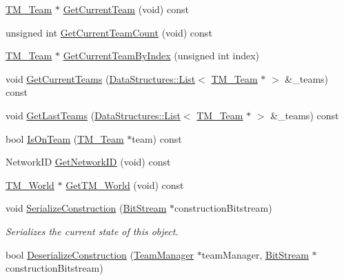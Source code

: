 \begin{DoxyCompactItemize}
\hyperlink{class_rak_net_1_1_t_m___team}{T\-M\-\_\-\-Team} $\ast$ \hyperlink{class_rak_net_1_1_t_m___team_member_a9a0d940b22353dc806fa71bcbac025ee}{Get\-Current\-Team} (void) const 
\item 
unsigned int \hyperlink{class_rak_net_1_1_t_m___team_member_a994cd7414421f0e01a5cc9c8b5d8c899}{Get\-Current\-Team\-Count} (void) const 
\item 
\hyperlink{class_rak_net_1_1_t_m___team}{T\-M\-\_\-\-Team} $\ast$ \hyperlink{class_rak_net_1_1_t_m___team_member_a8c9c72607051fb0c5769cb0d4d9b9744}{Get\-Current\-Team\-By\-Index} (unsigned int index)
\item 
void \hyperlink{class_rak_net_1_1_t_m___team_member_a722e179863d8f3810d6ec1326c8f0782}{Get\-Current\-Teams} (\hyperlink{class_data_structures_1_1_list}{Data\-Structures\-::\-List}$<$ \hyperlink{class_rak_net_1_1_t_m___team}{T\-M\-\_\-\-Team} $\ast$ $>$ \&\-\_\-teams) const 
\item 
void \hyperlink{class_rak_net_1_1_t_m___team_member_ad1c944003544544dc286080adb1bff1b}{Get\-Last\-Teams} (\hyperlink{class_data_structures_1_1_list}{Data\-Structures\-::\-List}$<$ \hyperlink{class_rak_net_1_1_t_m___team}{T\-M\-\_\-\-Team} $\ast$ $>$ \&\-\_\-teams) const 
\item 
bool \hyperlink{class_rak_net_1_1_t_m___team_member_a4473bcb51cb8ef03d80a667947db44fa}{Is\-On\-Team} (\hyperlink{class_rak_net_1_1_t_m___team}{T\-M\-\_\-\-Team} $\ast$team) const 
\item 
Network\-I\-D \hyperlink{class_rak_net_1_1_t_m___team_member_a5f8a84aba15b81123840d5b572322f09}{Get\-Network\-I\-D} (void) const 
\item 
\hyperlink{class_rak_net_1_1_t_m___world}{T\-M\-\_\-\-World} $\ast$ \hyperlink{class_rak_net_1_1_t_m___team_member_abd0b7f8951bc80a89dfc3d0f9c80c48a}{Get\-T\-M\-\_\-\-World} (void) const 
\item 
void \hyperlink{class_rak_net_1_1_t_m___team_member_acc2508c4ef05bc70eeae8e66adf5cabd}{Serialize\-Construction} (\hyperlink{class_rak_net_1_1_bit_stream}{Bit\-Stream} $\ast$construction\-Bitstream)
\begin{DoxyCompactList}\small\item\em Serializes the current state of this object. \end{DoxyCompactList}\item 
bool \hyperlink{class_rak_net_1_1_t_m___team_member_af6f8443d96f77d8fac58cd585ddfbb71}{Deserialize\-Construction} (\hyperlink{class_rak_net_1_1_team_manager}{Team\-Manager} $\ast$team\-Manager, \hyperlink{class_rak_net_1_1_bit_stream}{Bit\-Stream} $\ast$construction\-Bitstream)

\end{DoxyCompactItemize}
